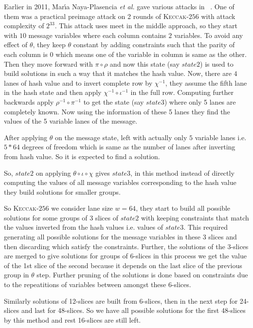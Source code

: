 \documentclass[runningheads]{llncs}
\newcommand{\KECCAK}{\mbox{\textsc{Keccak}}}
\newcommand{\etal}{\textit{et al. }}
\begin{document}
Earlier in 2011, Marı́a Naya-Plasencia \etal gave various attacks in ~\cite{naya2011practical}. One of them was a practical preimage attack on 2 rounds of \KECCAK-$256$ with attack complexity of $2^{33}$. This attack uses meet in the middle approach, so they start with $10$ message variables where each column contains $2$ variables. To avoid any effect of $\theta$, they keep $\theta$ constant by adding constraints such that the parity of each column is $0$ which means one of the variable in column is same as the other. Then they move forward with $\pi \circ \rho$ and now this state (say $state2$) is used to build solutions in such a way that it matches the hash value. Now, there are $4$ lanes of hash value and to invert complete row by $\chi^{-1}$, they assume the fifth lane in the hash state and then apply $\chi^{-1} \circ \iota^{-1}$ in the full row. Computing further backwards apply $\rho^{-1} \circ \pi^{-1}$ to get the state (say $state3$) where only 5 lanes are completely known. Now using the information of these 5 lanes they find the values of the 5 variable lanes of the message.

After applying $\theta$ on the message state, left with actually only $5$ variable lanes i.e. $5*64$ degrees of freedom which is same as the number of lanes after inverting from hash value. So it is expected to find a solution.

So, $state2$ on applying $\theta \circ \iota \circ \chi$ gives $state3$, in this method instead of directly computing the values of all message variables corresponding to the hash value they build solutions for smaller groups. 

So \KECCAK-$256$ we consider lane size $w = 64$, they start to build all possible solutions for some groups of 3 slices of $state2$ with keeping constraints that match the values inverted from the hash values i.e. values of $state3$. This required generating all possible solutions for the message variables in these 3 slices and then discarding which satisfy the constraints.
Further, the solutions of the 3-slices are merged to give solutions for groups of 6-slices in this process we get the value of the 1st slice of the second because it depends on the last slice of the previous group in $\theta$ step. Further pruning of the solutions is done based on constraints due to the repeatitions of variables between amongst these 6-slices.

Similarly solutions of 12-slices are built from 6-slices, then in the next step for 24-slices and last for 48-slices. 
So we have all possible solutions for the first 48-slices by this method and rest 16-slices are still left.
\end{document}
